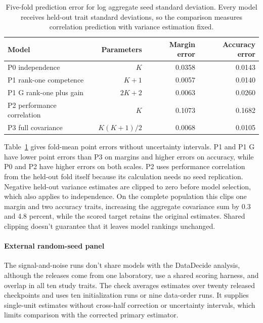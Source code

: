 \begin{table}[htbp]
\centering\small
\caption{Five-fold prediction error for log aggregate seed standard deviation. Every model receives held-out trait standard deviations, so the comparison measures correlation prediction with variance estimation fixed.}
\label{tab:original11}
\begin{tabular}{lrrr}\hline
Model & Parameters & Margin error & Accuracy error\\\hline
P0 independence & $K$ & 0.0358 & 0.0143\\
P1 rank-one competence & $K+1$ & 0.0057 & 0.0140\\
P1 G rank-one plus gain & $2K+2$ & 0.0063 & 0.0260\\
P2 performance correlation & $K$ & 0.1073 & 0.1682\\
P3 full covariance & $K(K+1)/2$ & 0.0068 & 0.0105\\\hline
\end{tabular}
\end{table}

Table~\ref{tab:original11} gives fold-mean point errors without uncertainty intervals. P1 and P1 G have lower point errors than P3 on margins and higher errors on accuracy, while P0 and P2 have higher errors on both scales. P2 uses performance correlation from the held-out fold itself because its calculation needs no seed replication. Negative held-out variance estimates are clipped to zero before model selection, which also applies to independence. On the complete population this clips one margin and two accuracy traits, increasing the aggregate covariance sum by 0.3 and 4.8 percent, while the scored target retains the original estimates. Shared clipping doesn't guarantee that it leaves model rankings unchanged.

\paragraph{External random-seed panel}
The signal-and-noise runs don't share models with the DataDecide analysis, although the releases come from one laboratory, use a shared scoring harness, and overlap in all ten study traits. The check averages estimates over twenty released checkpoints and uses ten initialization runs or nine data-order runs. It supplies single-unit estimates without cross-half correction or uncertainty intervals, which limits comparison with the corrected primary estimator.

